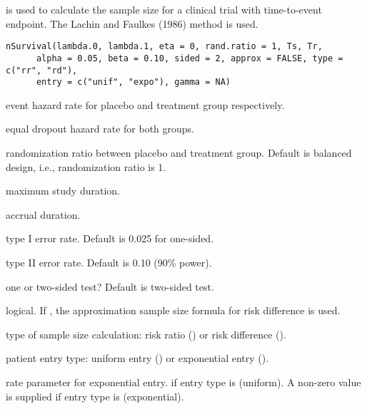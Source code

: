 \begin{Description}\relax
{} is used to calculate the sample size for a clinical trial with time-to-event endpoint. The Lachin and Faulkes (1986) method is used.
\end{Description}
\begin{Usage}
\begin{verbatim}
nSurvival(lambda.0, lambda.1, eta = 0, rand.ratio = 1, Ts, Tr,
      alpha = 0.05, beta = 0.10, sided = 2, approx = FALSE, type = c("rr", "rd"),
      entry = c("unif", "expo"), gamma = NA)
\end{verbatim}
\end{Usage}
\begin{Arguments}
\begin{ldescription}
\item[\code{lambda.0, lambda.1}] event hazard rate for placebo and treatment
group respectively.
\item[\code{eta}] equal dropout hazard rate for both groups.
\item[\code{rand.ratio}] randomization ratio between placebo and treatment
group. Default is balanced design, i.e., randomization ratio is 1.
\item[\code{Ts}] maximum study duration.
\item[\code{Tr}] accrual duration.
\item[\code{alpha}] type I error rate. Default is 0.025 for one-sided.
\item[\code{beta}] type II error rate. Default is 0.10 (90\% power).
\item[\code{sided}] one or two-sided test? Default is two-sided test.
\item[\code{approx}] logical. If , the approximation sample size
formula for risk difference is used.
\item[\code{type}] type of sample size calculation: risk ratio () or risk
difference ().
\item[\code{entry}] patient entry type: uniform entry () or exponential
entry ().
\item[\code{gamma}] rate parameter for exponential entry.  if entry type is
 (uniform). A non-zero value is supplied if entry type is
 (exponential).
\end{ldescription}
\end{Arguments}
